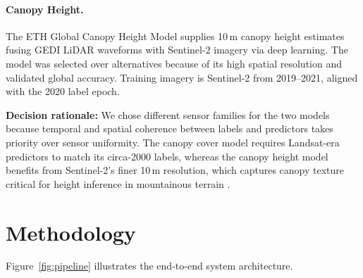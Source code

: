 \documentclass[12pt,a4paper,twoside]{article}
\begin{document}
\paragraph{Canopy Height.}
The ETH Global Canopy Height Model \citep{Lang2023} supplies 10\,m canopy height
estimates fusing GEDI LiDAR waveforms with Sentinel-2 imagery via deep learning.
The model was selected over alternatives because of its high spatial resolution and
validated global accuracy.  Training imagery is Sentinel-2 from 2019--2021, aligned
with the 2020 label epoch.

\textbf{Decision rationale:} We chose different sensor families for the two models
because temporal and spatial coherence between labels and predictors takes priority
over sensor uniformity.  The canopy cover model requires Landsat-era predictors to
match its circa-2000 labels, whereas the canopy height model benefits from
Sentinel-2's finer 10\,m resolution, which captures canopy texture critical for
height inference in mountainous terrain \citep{Belgiu2016,Lang2023}.

\section{Methodology}\label{sec:methods}

Figure~\ref{fig:pipeline} illustrates the end-to-end system architecture.
\end{document}
